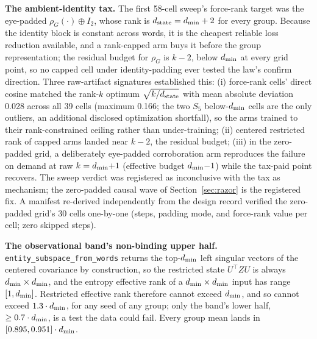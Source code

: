 \textbf{The ambient-identity tax.} The first 58-cell sweep's force-rank
target was the eye-padded $\rho_G(\cdot) \oplus I_2$, whose rank is
$d_{\mathrm{state}} = d_{\min} + 2$ for every group.
Because the identity block is constant across words, it is the
cheapest reliable loss reduction available, and a rank-capped arm buys it
before the group representation; the residual budget for $\rho_G$ is
$k - 2$, below $d_{\min}$ at every grid point, so no capped cell under
identity-padding ever tested the law's confirm direction. Three raw-artifact
signatures established this: (i) force-rank cells' direct cosine matched
the rank-$k$ optimum $\sqrt{k/d_{\mathrm{state}}}$ with mean absolute deviation 0.028
across all 39 cells (maximum 0.166; the two $S_5$ below-$d_{\min}$ cells are
the only outliers, an additional disclosed optimization shortfall), so the
arms trained to their rank-constrained ceiling rather than under-training;
(ii) centered restricted rank of capped arms landed near $k - 2$, the
residual budget; (iii) in the zero-padded grid, a deliberately
eye-padded corroboration arm reproduces the failure on demand at raw
$k = d_{\min}{+}1$ (effective budget $d_{\min}{-}1$) while the tax-paid point
recovers.
The sweep verdict was registered as inconclusive with the tax as
mechanism; the zero-padded causal wave of Section~\ref{sec:razor} is
the registered fix.
A manifest re-derived independently from the design record verified the
zero-padded grid's 30 cells one-by-one (steps, padding mode, and force-rank
value per cell; zero skipped steps).

\textbf{The observational band's non-binding upper half.}
\texttt{entity\_subspace\_from\_words} returns the top-$d_{\min}$ left
singular vectors of the centered covariance by construction, so the
restricted state $U^{\top} Z U$ is always $d_{\min} \times d_{\min}$, and the
entropy effective rank of a $d_{\min} \times d_{\min}$ input has range
$[1, d_{\min}]$. Restricted effective rank therefore cannot exceed $d_{\min}$,
and so cannot exceed $1.3 \cdot d_{\min}$, for any seed of any group; only
the band's lower half, $\geq 0.7 \cdot d_{\min}$, is a test the data could
fail. Every group mean lands in $[0.895, 0.951] \cdot d_{\min}$.

